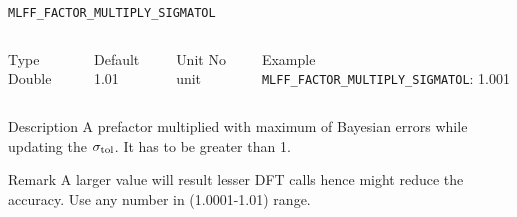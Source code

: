 \begin{frame}[allowframebreaks]{\texttt{{MLFF\_FACTOR\_MULTIPLY\_SIGMATOL}}} \label{MLFF_FACTOR_MULTIPLY_SIGMATOL}
\vspace*{-12pt}
\begin{columns}
\begin{block}{Type}
Double
\end{block}

\begin{block}{Default}
1.01
\end{block}

\begin{block}{Unit}
No unit
\end{block}

\begin{block}{Example}
\texttt{MLFF\_FACTOR\_MULTIPLY\_SIGMATOL}: 1.001
\end{block}
\end{columns}

\begin{block}{Description}
 A prefactor multiplied with maximum of Bayesian errors while updating the $\sigma_{\rm tol}$. It has to be greater than 1.
\end{block}

\begin{block}{Remark}
A larger value will result lesser DFT calls hence might reduce the accuracy. Use any number in (1.0001-1.01) range.
\end{block}
\end{frame}

